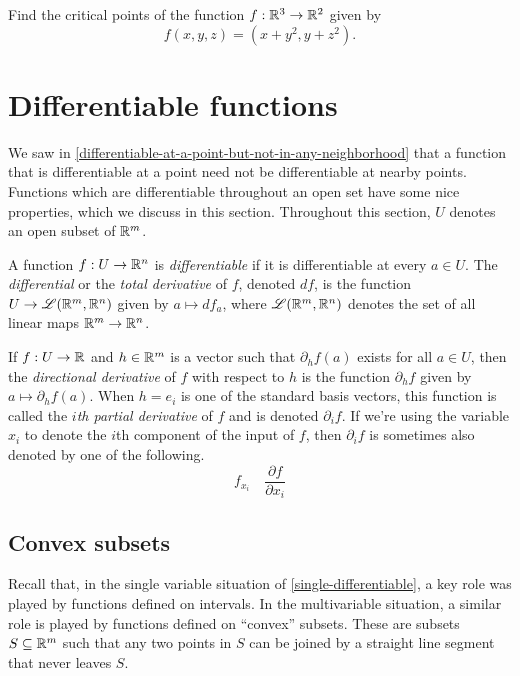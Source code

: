\begin{exercise}
	Find the critical points of the function $f : \mathbb{R}^3 \to \mathbb{R}^2$ given by \[ f(x,y,z) = (x+y^2, y+z^2). \]
\end{exercise}

\section{Differentiable functions}

We saw in \cref{differentiable-at-a-point-but-not-in-any-neighborhood} that a function that is differentiable at a point need not be differentiable at nearby points. Functions which are differentiable throughout an open set have some nice properties, which we discuss in this section. Throughout this section, $U$ denotes an open subset of $\mathbb{R}^m$. 

\begin{definition}  
	A function $f : U \to \mathbb{R}^n$ is \emph{differentiable} if it is differentiable at every $a \in U$. The \emph{differential} or the \emph{total derivative} of $f$, denoted $df$, is the function $U \to \mathscr{L}(\mathbb{R}^m, \mathbb{R}^n)$ given by $a \mapsto df_a$, where $\mathscr{L}(\mathbb{R}^m, \mathbb{R}^n)$ denotes the set of all linear maps $\mathbb{R}^m \to \mathbb{R}^n$.  
\end{definition}

\begin{definition}
	If $f : U \to \mathbb{R}$ and $h \in \mathbb{R}^m$ is a vector such that $\partial_h f(a)$ exists for all $a \in U$, then the \emph{directional derivative} of $f$ with respect to $h$ is the function $\partial_h f$ given by $a \mapsto \partial_h f(a)$. When $h = e_i$ is one of the standard basis vectors, this function is called the \emph{$i$th partial derivative} of $f$ and is denoted $\partial_i f$. If we're using the variable $x_i$ to denote the $i$th component of the input of $f$, then $\partial_i f$ is sometimes also denoted by one of the following. 
	\[ f_{x_i} \quad \frac{\partial f}{\partial x_i} \]
\end{definition}

\subsection{Convex subsets}

Recall that, in the single variable situation of \cref{single-differentiable}, a key role was played by functions defined on intervals. In the multivariable situation, a similar role is played by functions defined on ``convex'' subsets. These are subsets $S \subseteq \mathbb{R}^m$ such that any two points in $S$ can be joined by a straight line segment that never leaves $S$. 

